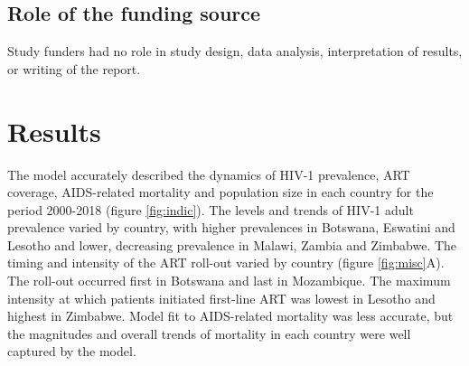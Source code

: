 \documentclass{article}
\begin{document}
\subsection{Role of the funding source}
Study funders had no role in study design, data analysis, interpretation of results, or writing of the report.

\section{Results}

The model accurately described the dynamics of HIV-1 prevalence, ART coverage, AIDS-related mortality and population size in each country for the period 2000-2018 (figure \ref{fig:indic}).
The levels and trends of HIV-1 adult prevalence varied by country, with higher prevalences in Botswana, Eswatini and Lesotho and lower, decreasing prevalence in Malawi, Zambia and Zimbabwe. 
The timing and intensity of the ART roll-out varied by country (figure \ref{fig:misc}A). 
The roll-out occurred first in Botswana and last in Mozambique. The maximum intensity at which patients initiated first-line ART was lowest in Lesotho and highest in Zimbabwe. Model fit to AIDS-related mortality was less accurate, but the magnitudes and overall trends of mortality in each country were well captured by the model.
\end{document}
